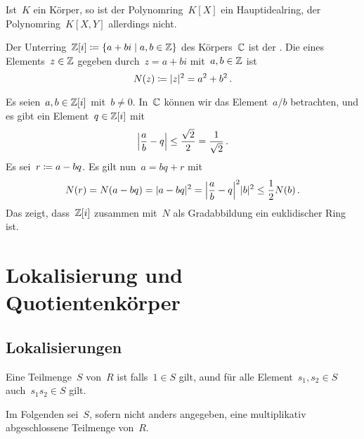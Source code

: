 \begin{example}
  Ist~$K$ ein Körper, so ist der Polynomring~$K[X]$ ein Hauptidealring, der Polynomring~$K[X,Y]$ allerdings nicht.
\end{example}

\begin{example}
  Der Unterring~$\Integer[i] \defined \{a + bi \suchthat a, b \in \Integer\}$ des Körpers~$\Complex$ ist der .
  Die  eines Elements~$z \in \Integer$ gegeben durch~$z = a + bi$ mit~$a, b \in \Integer$ ist
  \[
    N(z)
    \defined
    \abs{z}^2
    =
    a^2 + b^2 \,.
  \]

  Es seien~$a, b \in \Integer[i]$ mit~$b \neq 0$.
  In~$\Complex$ können wir das Element~$a/b$ betrachten, und es gibt ein Element~$q \in \Integer[i]$ mit
  \[
    \abs*{ \frac{a}{b} - q }
    \leq
    \frac{\sqrt{2}}{2}
    =
    \frac{1}{\sqrt{2}} \,.
  \]
  Es sei~$r \defined a - bq$.
  Es gilt nun~$a = bq + r$ mit
  \[
    N(r)
    =
    N(a - bq)
    =
    \abs{a-bq}^2
    =
    \abs*{ \frac{a}{b} - q }^2 \abs{b}^2
    \leq
    \frac{1}{2} N(b) \,.
  \]
  Das zeigt, dass~$\Integer[i]$ zusammen mit~$N$ als Gradabbildung ein euklidischer Ring ist.
\end{example}





\section{Lokalisierung und Quotientenkörper}



\subsection{Lokalisierungen}

\begin{definition}
  Eine Teilmenge~$S$ von~$R$ ist  falls~$1 \in S$ gilt, aund für alle Element~$s_1, s_2 \in S$ auch~$s_1 s_2 \in S$ gilt.
\end{definition}

\begin{convention}
  Im Folgenden sei~$S$, sofern nicht anders angegeben, eine multiplikativ abgeschlossene Teilmenge von~$R$.
\end{convention}

